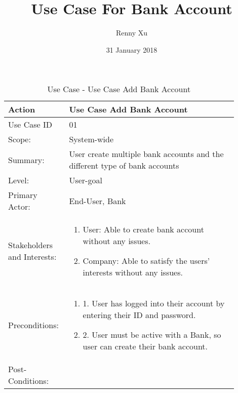 \documentclass{article}
\title{Use Case For Bank Account}
\author{Renny Xu }
\date{31 January 2018}
\newcounter{use case ID}
\newcommand\tabularhead[1]{
\begin{table}[ht]
    \addtocounter{use case ID}{1}
    \caption{Use Case \arabic{use case ID} - #1}
    \vspace{0.2cm}
    \begin{tabular}{|p{0.2\linewidth}|p{0.70\linewidth}|}
    \hline
        \textbf{Action} & \textbf{#1} \\
        \hline}
\newcommand\addrow[2]{#1 & #2\\ \hline}
\newcommand\addmulrow[2]{ \begin{minipage}[t][][t]{2.5cm}#1\end{minipage}
        &\begin{minipage}[t][][t]{11cm}
        \begin{enumerate}[itemsep=-1ex] #2   \end{enumerate}
    \end{minipage}\vfill\\ \hline}
\newenvironment{usecase}{\tabularhead}
{\hline\end{tabular}\end{table}}
\begin{document}
\maketitle

\begin{usecase}{Use Case Add Bank Account}


\rule{0pt}{4ex}
\addrow{Use Case ID}{01}
\addrow{Scope:}{System-wide}

\addrow{Summary:}{User create multiple bank accounts and the different type of bank accounts}

\addrow{Level:}{User-goal}

\addrow{Primary Actor:}{End-User, Bank}

\addmulrow{Stakeholders and Interests:}{
	\item User: Able to create bank account without any issues.
	\item Company: Able to satisfy the users' interests without any issues.
}

\addmulrow{Preconditions:}{
    \item [1.]User has logged into their account by entering their ID and password.
    \item [2.]User must be active with a Bank, so user can create their bank account.} 

\addrow{Post-Conditions:}{}



\end{usecase}
\end{document}
